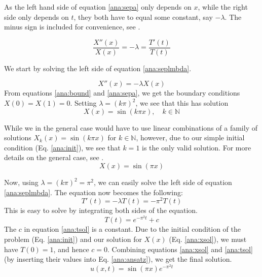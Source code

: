 As the left hand side of equation \ref{ana:sepa} only depends on $x$, while the right side only depends on $t$, they both have to equal some constant, say $-\lambda$. The minus sign is included for convenience, see \textcite[p. 90]{tveitoPDE}.

\begin{equation}
     \frac{X''(x)}{X(x)} = -\lambda = \frac{T'(t)}{T(t)} \label{ana:seplmbda}
\end{equation}

We start by solving the left side of equation \ref{ana:seplmbda}.

\begin{equation*}
    X''(x) = -\lambda X(x)
\end{equation*}
From equations \ref{ana:bound} and \ref{ana:sepa}, we get the boundary conditions 
$X(0) = X(1) = 0$.
Setting $\lambda = (k\pi)^2$, we see that this has solution
\begin{equation*}
    X(x) = \sin(k \pi x) , \quad k \in \mathbb{N}
\end{equation*}

While we in the general case would have to use linear combinations of a family of solutions $X_k(x) = \sin(k \pi x)$ for $k \in \mathbb{N}$, however, due to our simple initial condition (Eq. \ref{ana:init}), we see that $k=1$ is the only valid solution. 
For more details on the general case, see \textcite[p. 92]{tveitoPDE}.
\begin{equation}\label{ana:xsol}
        X(x) = \sin(\pi x)
\end{equation}

Now, using $\lambda = (k\pi)^2 = \pi^2$, we can easily solve the left side of equation \ref{ana:seplmbda}.
The equation now becomes the following:
\begin{equation*}
    T'(t) = -\lambda T(t) = -\pi^2 T(t)
\end{equation*}
This is easy to solve by integrating both sides of the equation.
\begin{equation}\label{ana:tsol}
    T(t) = e^{-\pi^2 t} + c
\end{equation}
The $c$ in equation \ref{ana:tsol} is a constant.
Due to the initial condition of the problem (Eq. \ref{ana:init}) and our solution for $X(x)$ (Eq. \ref{ana:xsol}), we must have $T(0) = 1$, and hence $c = 0$.
Combining equations \ref{ana:xsol} and \ref{ana:tsol} (by inserting their values into Eq. \ref{ana:ansatz}), we get the final solution.
\begin{equation}
    u(x,t) = \sin(\pi x) e^{-\pi^2 t}
\end{equation}

